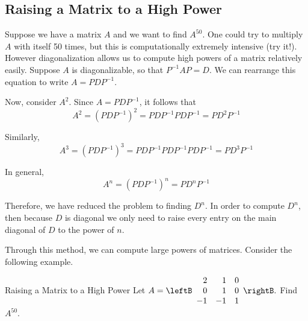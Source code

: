 \subsection{Raising a Matrix to a High Power}

Suppose we have a matrix $A$ and we want to find $A^{50}$. One could
try to multiply $A$ with itself 50 times, but this is computationally
extremely intensive (try it!). However diagonalization allows us to
compute high powers of a matrix relatively easily.  Suppose $A$ is
diagonalizable, so that $P^{-1}AP=D$. We can rearrange this equation
to write $A=PDP^{-1}$.

Now, consider $A^{2}$. Since $A=PDP^{-1}$, it follows that 
\begin{equation*}
A^{2} = \left( PDP^{-1}\right) ^{2}=PDP^{-1}PDP^{-1}=PD^{2}P^{-1}
\end{equation*}

Similarly, 
\begin{equation*}
A^3 = \left( PDP^{-1}\right) ^{3}=PDP^{-1}PDP^{-1}PDP^{-1}=PD^{3}P^{-1}
\end{equation*}

In general,
\begin{equation*}
A^n = \left( PDP^{-1}\right) ^{n}=PD^{n}P^{-1}
\end{equation*}

Therefore, we have reduced the problem to finding $D^{n}$. In order to
compute $D^{n}$, then because $D$ is diagonal we only need to raise
every entry on the main diagonal of $D$ to the power of $n$.

Through this method, we can compute large powers of matrices. Consider the following example.

\begin{example}{Raising a Matrix to a High Power}\label{exa:matrixhighpower}
Let
  $A=\leftB 
\begin{array}{rrr}
2 & 1 & 0 \\
0 & 1 & 0 \\
-1 & -1 & 1
\end{array}
\rightB. $ Find $A^{50}.$
\end{example}

